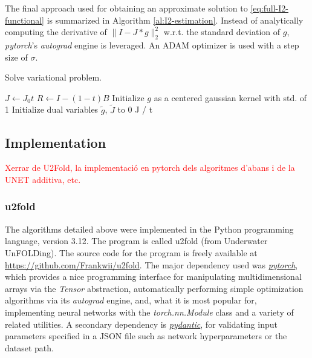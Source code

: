 \documentclass[twocolumn,twoside,a4paper,10pt]{IEEEtran}
\newcommand{\Frank}[1]{\textcolor{red}{#1}}
\begin{document}
The final approach used for obtaining an approximate solution to \cref{eq:full-I2-functional} is summarized in Algorithm \ref{al:I2-estimation}. Instead of analytically computing the derivative of \(\|I-J\ast g\|_2^2\) w.r.t. the standard deviation of \(g\), \textit{pytorch}'s \textit{autograd} engine is leveraged. An ADAM optimizer is used with a step size of \(\sigma\).

\begin{algorithm}\caption{Solve variational problem.}
\label{al:I2-estimation}
\(J\gets J_0t\)\;
\(R\gets I - (1-t)B\)\;
Initialize \(g\) as a centered gaussian kernel with std. of 1\;
Initialize dual variables \(\tilde{g}\), \(\tilde{J}\) to 0\;
\Return J / t
\end{algorithm}

\subsection{Implementation}
\Frank{Xerrar de U2Fold, la implementació en pytorch dels algoritmes d'abans i de la UNET additiva, etc.}

\subsubsection{u2fold}
The algorithms detailed above were implemented in the Python programming
language, version 3.12. The program is called u2fold (from Underwater UnFOLDing). The source code for the program is freely available at \href{https://github.com/Frankwii/u2fold}{https://github.com/Frankwii/u2fold}.
The major dependency used was \href{https://pytorch.org/}{\textit{pytorch}},
which provides a nice programming interface for manipulating multidimensional 
arrays via the \textit{Tensor} abstraction, automatically performing simple
optimization algorithms via its \textit{autograd} engine, and, what it is most
popular for, implementing neural networks with the \textit{torch.nn.Module}
class and a variety of related utilities. A secondary dependency is
\href{https://pydantic.com.cn/en/}{\textit{pydantic}}, for validating input
parameters specified in a JSON file
such as network hyperparameters or the dataset path.
\end{document}
